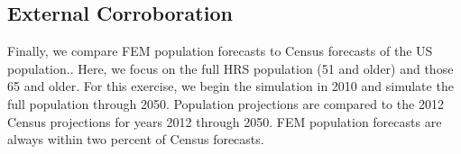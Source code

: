 \subsection{External Corroboration}
Finally, we compare FEM population forecasts to Census forecasts of the US population..  Here, we focus on the full HRS population (51 and older) and those 65 and 
older.  For this exercise, we begin the simulation in 2010 and simulate the full population through 2050.  Population projections are compared to the 2012 Census 
projections for years 2012 through 2050.  FEM population forecasts are always within two percent of Census forecasts.